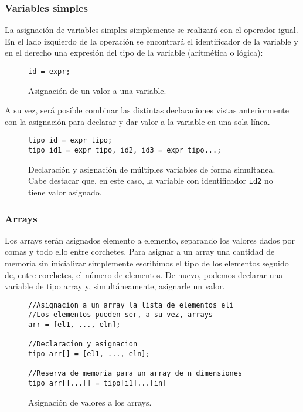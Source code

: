 \subsubsection{Variables simples}
La asignación de variables simples simplemente se realizará con el operador
igual. En el lado izquierdo de la operación se encontrará el identificador de la
variable y en el derecho una expresión del tipo de la variable (aritmética o
lógica):
\begin{figure}[htbp]
    \centering
    \begin{lstlisting}
id = expr;
    \end{lstlisting}
    \caption{Asignación de un valor a una variable.}
\end{figure}
A su vez, será posible combinar las distintas declaraciones vistas anteriormente
con la asignación para declarar y dar valor a la variable en una sola línea.
\begin{figure}[htbp]
    \centering
    \begin{lstlisting}
tipo id = expr_tipo;
tipo id1 = expr_tipo, id2, id3 = expr_tipo...;
    \end{lstlisting}
    \caption{Declaración y asignación de múltiples variables de forma
    simultanea. Cabe destacar que, en este caso, la variable con identificador \lstinline{id2}
    no tiene valor asignado.}
\end{figure}

\subsubsection{Arrays}
Los arrays serán asignados elemento a elemento, separando los valores dados por
comas y todo ello entre corchetes. Para asignar a un array una cantidad de
memoria sin inicializar simplemente escribimos el tipo de los elementos seguido
de, entre corchetes, el número de elementos. De nuevo, podemos declarar una
variable de tipo array y, simultáneamente, asignarle un valor.
\begin{figure}[htbp]
    \centering
    \begin{lstlisting}
//Asignacion a un array la lista de elementos eli
//Los elementos pueden ser, a su vez, arrays
arr = [el1, ..., eln];

//Declaracion y asignacion
tipo arr[] = [el1, ..., eln];

//Reserva de memoria para un array de n dimensiones
tipo arr[]...[] = tipo[i1]...[in] 
    \end{lstlisting}
    \caption{Asignación de valores a los arrays.}
\end{figure}

